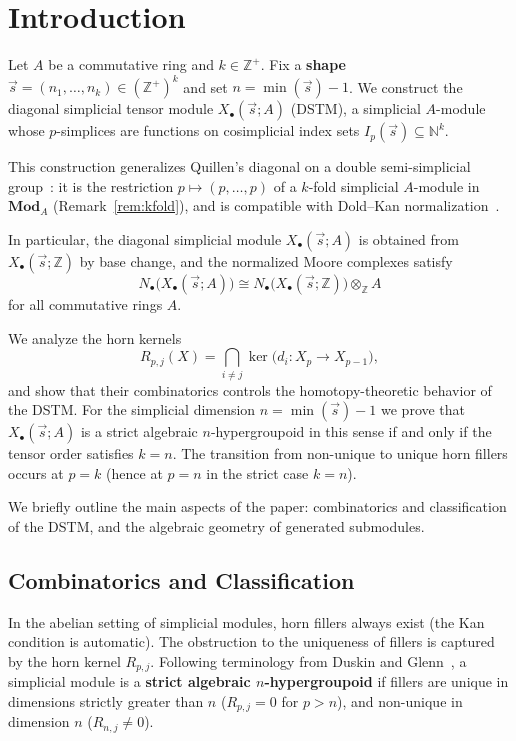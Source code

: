 \section{Introduction}
\label{sec:intro}

Let $A$ be a commutative ring and $k\in\mathbb{Z}^+$.
Fix a \textbf{shape} $\vec{s}=(n_1,\ldots,n_k)\in(\mathbb{Z}^+)^k$ and set $n=\min(\vec{s})-1$.
We construct the diagonal simplicial tensor module $X_\bullet(\vec{s};A)$ (DSTM), a simplicial $A$-module
whose $p$-simplices are functions on cosimplicial index sets $I_p(\vec{s})\subseteq\mathbb{N}^k$.



This construction generalizes Quillen's diagonal on a double semi-simplicial group~\cite{Quillen1966}:
it is the restriction $p\mapsto(p,\ldots,p)$ of a $k$-fold simplicial $A$-module in $\mathbf{Mod}_A$
(Remark~\ref{rem:kfold}), and is compatible with Dold--Kan normalization~\cite{Dold1958,Kan1958,Weibel}.



In particular, the diagonal simplicial module $X_\bullet(\vec{s};A)$ is obtained from
$X_\bullet(\vec{s};\mathbb{Z})$ by base change, and the normalized Moore complexes satisfy
\[
N_\bullet\bigl(X_\bullet(\vec{s};A)\bigr)
  \cong N_\bullet\bigl(X_\bullet(\vec{s};\mathbb{Z})\bigr)\otimes_{\mathbb{Z}} A
\]
for all commutative rings $A$.




We analyze the horn kernels
\[
R_{p,j}(X)=\bigcap_{i\neq j}\ker\bigl(d_i:X_p\to X_{p-1}\bigr),
\]
and show that their combinatorics controls the homotopy-theoretic behavior of the DSTM.
For the simplicial dimension $n=\min(\vec{s})-1$ we prove that $X_\bullet(\vec{s};A)$ is
a strict algebraic $n$-hypergroupoid in this sense if and only if the tensor order satisfies $k=n$.
The transition from non-unique to unique horn fillers occurs at $p=k$ (hence at $p=n$ in the strict case $k=n$).



We briefly outline the main aspects of the paper: combinatorics and classification of the DSTM,
and the algebraic geometry of generated submodules.


\subsection*{Combinatorics and Classification}


In the abelian setting of simplicial modules, horn fillers always exist (the Kan condition is automatic).
The obstruction to the uniqueness of fillers is captured by the horn kernel $R_{p,j}$.
Following terminology from Duskin and Glenn~\cite{Duskin1979,Glenn1982},
a simplicial module is a \textbf{strict algebraic $n$-hypergroupoid} if fillers are unique
in dimensions strictly greater than $n$ ($R_{p,j}=0$ for $p>n$), and non-unique in dimension $n$ ($R_{n,j}\ne 0$).


